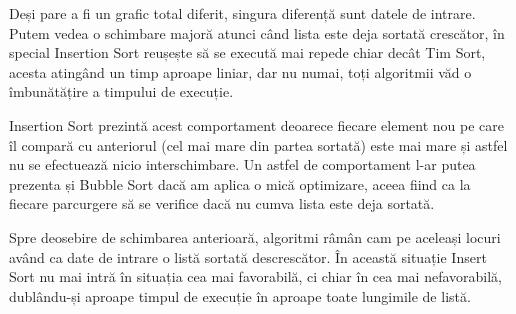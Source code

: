 \documentclass[12pt]{article}
\begin{document}
Deși pare a fi un grafic total diferit, singura diferență sunt datele de intrare. Putem vedea o schimbare majoră
atunci când lista este deja sortată crescător, în special Insertion Sort reușește să se execută mai repede chiar decât Tim Sort,
acesta atingând un timp aproape liniar, dar nu numai, toți algoritmii văd o îmbunătățire a timpului de execuție.

Insertion Sort prezintă acest comportament deoarece fiecare element nou pe care îl compară cu anteriorul (cel mai mare din partea sortată)
este mai mare și astfel nu se efectuează nicio interschimbare. Un astfel de comportament l-ar putea prezenta și Bubble Sort
dacă am aplica o mică optimizare, aceea fiind ca la fiecare parcurgere să se verifice dacă nu cumva lista este deja sortată.



\pagebreak

\begin{figure}[!h]
    \centering
\end{figure}

Spre deosebire de schimbarea anterioară, algoritmi râmân cam pe aceleași locuri având ca date de intrare
o listă sortată descrescător. În această situație Insert Sort nu mai intră în situația cea mai favorabilă, ci chiar în cea mai
nefavorabilă, dublându-și aproape timpul de execuție în aproape toate lungimile de listă.

\pagebreak
\end{document}
